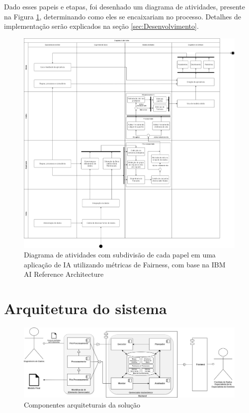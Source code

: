 \documentclass[portugues]{ic-tese}
\begin{document}
Dado esses papeis e etapas, foi desenhado um diagrama de atividades, presente na Figura \ref{fig:AIRoles}, determinando como eles se encaixariam no processo. Detalhes de implementação serão explicados na seção \ref{sec:Desenvolvimento}.

\begin{figure}[H]
\centering
\includegraphics[scale=0.25]{images/Diagrama_Atividades.jpg}
\caption {Diagrama de atividades com subdivisão de cada papel em uma aplicação de IA utilizando métricas de Fairness, com base na IBM AI Reference Architecture~\citep{IBM_2021}}
\label{fig:AIRoles}
\end{figure}

\section{Arquitetura do sistema}

\begin{figure}[h]
\centering
\includegraphics[scale=0.35]{images/backend-frontend-ml.jpg}
\caption {Componentes arquiteturais da solução}
\label{fig:BackendFrontendML}
\end{figure}
\end{document}
